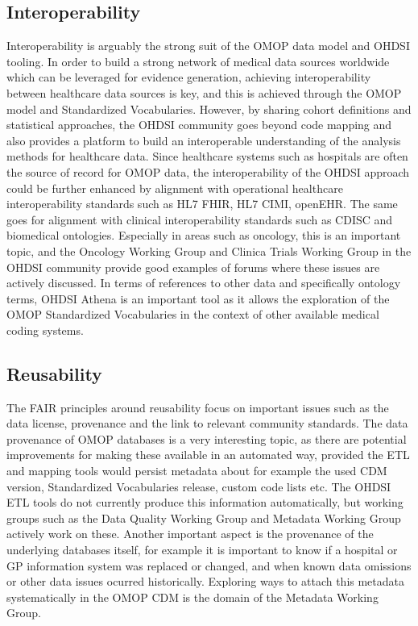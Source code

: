 \documentclass[11pt]{book}
\theoremstyle{definition}
\theoremstyle{definition}
\theoremstyle{definition}
\theoremstyle{remark}
\begin{document}
\hypertarget{interoperability}{%
\subsection{Interoperability}\label{interoperability}}

Interoperability is arguably the strong suit of the OMOP data model and OHDSI tooling. In order to build a strong network of medical data sources worldwide which can be leveraged for evidence generation, achieving interoperability between healthcare data sources is key, and this is achieved through the OMOP model and Standardized Vocabularies. However, by sharing cohort definitions and statistical approaches, the OHDSI community goes beyond code mapping and also provides a platform to build an interoperable understanding of the analysis methods for healthcare data.
Since healthcare systems such as hospitals are often the source of record for OMOP data, the interoperability of the OHDSI approach could be further enhanced by alignment with operational healthcare interoperability standards such as HL7 FHIR, HL7 CIMI, openEHR. The same goes for alignment with clinical interoperability standards such as CDISC and biomedical ontologies. Especially in areas such as oncology, this is an important topic, and the Oncology Working Group and Clinica Trials Working Group in the OHDSI community provide good examples of forums where these issues are actively discussed.
In terms of references to other data and specifically ontology terms, OHDSI Athena is an important tool as it allows the exploration of the OMOP Standardized Vocabularies in the context of other available medical coding systems.

\hypertarget{reusability}{%
\subsection{Reusability}\label{reusability}}

The FAIR principles around reusability focus on important issues such as the data license, provenance and the link to relevant community standards. The data provenance of OMOP databases is a very interesting topic, as there are potential improvements for making these available in an automated way, provided the ETL and mapping tools would persist metadata about for example the used CDM version, Standardized Vocabularies release, custom code lists etc. The OHDSI ETL tools do not currently produce this information automatically, but working groups such as the Data Quality Working Group and Metadata Working Group actively work on these. Another important aspect is the provenance of the underlying databases itself, for example it is important to know if a hospital or GP information system was replaced or changed, and when known data omissions or other data issues ocurred historically. Exploring ways to attach this metadata systematically in the OMOP CDM is the domain of the Metadata Working Group.
\end{document}
